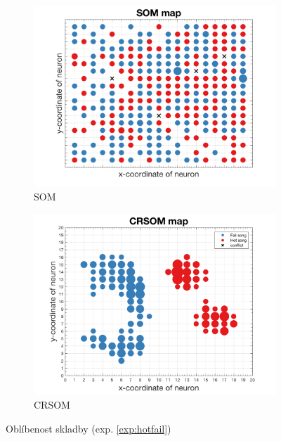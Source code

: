 \documentclass[thesis=M,czech]{FITthesis}[2012/06/26]
\begin{document}
\begin{figure}
\centering
\begin{subfigure}{.5\textwidth}
  \centering
  \includegraphics[width=.99\linewidth]{exp_trend_fail2_som.png}
  \caption{SOM}
  \label{fig:sub1}
\end{subfigure}%
\begin{subfigure}{.5\textwidth}
  \centering
  \includegraphics[width=.99\linewidth]{exp_trend_fail2_crsom.png}
  \caption{CRSOM}
  \label{fig:sub2}
\end{subfigure}
\caption{Oblíbenost skladby (exp. \ref{exp:hotfail})}
\label{fig:hotfail}
\end{figure}
\end{document}
